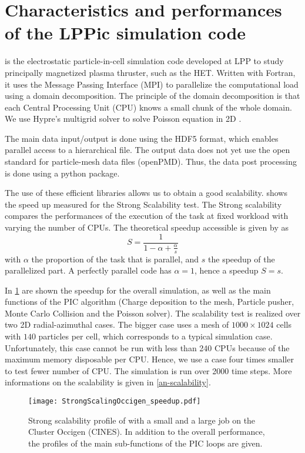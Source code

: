 

\section{Characteristics and performances of the LPPic simulation code }
\label{sec-lppic}


\LPPic is the electrostatic particle-in-cell simulation code developed at \ac{LPP} to study principally magnetized plasma thruster, such as the \ac{HET}.
Written with Fortran, it uses the Message Passing Interface (MPI) to parallelize the computational load using a domain decomposition.
The principle of the domain decomposition is that each Central Processing Unit (CPU) knows a small chunk of the whole domain.
We use {\sc Hypre}'s multigrid solver to solve Poisson equation in \ac{2D} \citep{falgout2002}.

The main data input/output is done using the HDF5 format, which enables parallel access to a hierarchical file.
The output data does not yet use the open standard for particle-mesh data files (openPMD).
Thus, the data post processing is done using a python package.

The use of these efficient libraries allows us to obtain a good scalability.
 shows the speed up measured for the Strong Scalability test.
The Strong scalability compares the performances of the execution of the task at fixed workload with varying the number of CPUs.
The theoretical speedup accessible is given by \citet{amdahl1967} as
\begin{equation} \label{eq-amdahl}
  S = \frac{1}{1 - \alpha + \frac{\alpha}{s}}
\end{equation}
with $\alpha$ the proportion of the task that is parallel, and $s$ the speedup of the parallelized part.
A perfectly parallel code has $\alpha=1$, hence a speedup $S=s$.

In \cref{fig-strongperfo} are shown the speedup for the overall simulation, as well as the main functions of the \ac{PIC} algorithm (Charge deposition to the mesh, Particle pusher, Monte Carlo Collision and the Poisson solver).
The scalability test is realized over two \ac{2D} radial-azimuthal cases. 
The bigger case uses a mesh of $1000\times1024$ cells with $140$ particles per cell, which corresponds to a typical simulation case.
Unfortunately, this case cannot be run with less than 240 CPUs because of the maximum memory disposable per CPU. 
Hence, we use a case four times smaller to test fewer number of CPU.
The simulation is run over 2000 time steps.
More informations on the scalability is given in \cref{an-scalability}.
\begin{figure}[hbt]
  \centering
  \texttt{[image: StrongScalingOccigen\_speedup.pdf]}
  \caption{Strong scalability profile of \LPPic with a small and a large job on the Cluster Occigen (CINES). In addition to the overall performance, the profiles of the main sub-functions of the \acs{PIC} loops are given. }
  \label{fig-strongperfo}
\end{figure}


